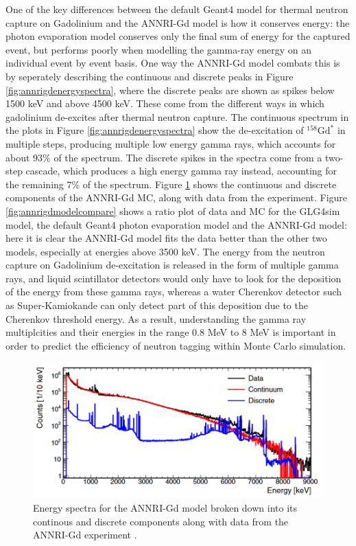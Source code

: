 One of the key differences between the default Geant4 model for thermal neutron capture on Gadolinium and the ANNRI-Gd model is how it conserves energy: the photon evaporation model conserves only the final sum of energy for the captured event, but performs poorly when modelling the gamma-ray energy on an individual event by event basis. One way the ANNRI-Gd model combats this is by seperately describing the continuous and discrete peaks in Figure \ref{fig:annrigdenergyspectra}, where the discrete peaks are shown as spikes below 1500 keV and above 4500 keV. These come from the different ways in which gadolinium de-excites after thermal neutron capture. The continuous spectrum in the plots in Figure \ref{fig:annrigdenergyspectra} show the de-excitation of ${ }^{158} \mathrm{Gd}^{*}$ in multiple steps, producing multiple low energy gamma rays, which accounts for about 93\% of the spectrum. The discrete spikes in the spectra come from a two-step cascade, which produces a high energy gamma ray instead, accounting for the remaining 7\% of the spectrum.
Figure \ref{fig:continousdiscrete} shows the continuous and discrete components of the ANNRI-Gd MC, along with data from the experiment. Figure \ref{fig:annrigdmodelcompare} shows a ratio plot of data and MC for the GLG4sim model, the default Geant4 photon evaporation model and the ANNRI-Gd model: here it is clear the ANNRI-Gd model fits the data better than the other two models, especially at energies above 3500 keV. The energy from the neutron capture on Gadolinium de-excitation is released in the form of multiple gamma rays, and liquid scintillator detectors would only have to look for the deposition of the energy from these gamma rays, whereas a water Cherenkov detector such as Super-Kamiokande can only detect part of this deposition due to the Cherenkov threshold energy. As a result, understanding the gamma ray multiplcities and their energies in the range 0.8 MeV to 8 MeV is important in order to predict the efficiency of neutron tagging within Monte Carlo simulation.


\begin{figure}[htp]
\includegraphics[width=\textwidth]{Figures/continousdiscrete.png}
\caption{Energy spectra for the ANNRI-Gd model broken down into its continous and discrete components along with data from the ANNRI-Gd experiment \cite{annri_gd_energy}.}
\label{fig:continousdiscrete}
\end{figure}

